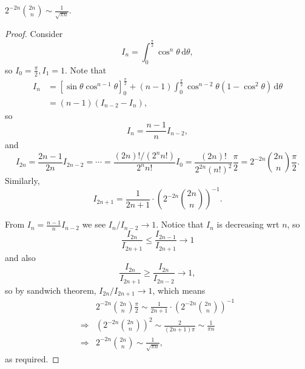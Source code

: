 \begin{lemma}\label{lma:stirling2}
    $\displaystyle 2^{-2n}\binom{2n}{n}\sim \frac{1}{\sqrt{\pi n}}$. 
\end{lemma}
\begin{proof}
    Consider 
    \[
        I_n = \int_{0}^{\frac{\pi}{2}} \cos^n \theta \,\mathrm{d}\theta,
    \]
    so $I_0=\frac{\pi}{2}, I_1=1$. Note that 
    \begin{align*}
        I_n &= \left[ \sin \theta \cos^{n-1} \theta \right]_{0}^{\frac{\pi}{2}} + (n-1)\int_{0}^{\frac{\pi}{2}} \cos^{n-2} \theta(1-\cos^2 \theta) \,\mathrm{d}\theta\\ 
        &= (n-1)(I_{n-2}-I_{n}),
    \end{align*}
    so
    \[
        I_n = \frac{n-1}{n}I_{n-2},
    \]
    and
    \[
        I_{2n} = \frac{2n-1}{2n}I_{2n-2} = \cdots = \frac{(2n)!/(2^n n!)}{2^n n!} I_0 = \frac{(2n)!}{2^{2n} (n!)^2}\frac{\pi}{2}=2^{-2n}\binom{2n}{n}\frac{\pi}{2}.
    \]
    Similarly,
    \[
        I_{2n+1} = \frac{1}{2n+1} \cdot \left( 2^{-2n}\binom{2n}{n} \right)^{-1}.
    \]

    From $I_n = \frac{n-1}{n}I_{n-2}$ we see $ I_n/I_{n-2}\to 1 $. Notice that $I_n$ is decreasing wrt $n$, so 
    \[
        \frac{I_{2n}}{I_{2n+1}}\le \frac{I_{2n-1}}{I_{2n+1}}\to 1
    \]
    and also 
    \[
        \frac{I_{2n}}{I_{2n+1}}\ge \frac{I_{2n}}{I_{2n-2}}\to 1,
    \]
    so by sandwich theorem, $ I_{2n}/I_{2n+1}\to 1$, which means 
    \begin{align*}
        &2^{-2n}\binom{2n}{n}\frac{\pi}{2} \sim \frac{1}{2n+1} \cdot \left( 2^{-2n}\binom{2n}{n} \right)^{-1}\\ 
        \Longrightarrow & \left( 2^{-2n}\binom{2n}{n} \right)^2 \sim \frac{2}{(2n+1)\pi} \sim \frac{1}{\pi n}\\ 
        \Longrightarrow & 2^{-2n}\binom{2n}{n} \sim \frac{1}{\sqrt{\pi n}},
    \end{align*}
    as required.
\end{proof}

